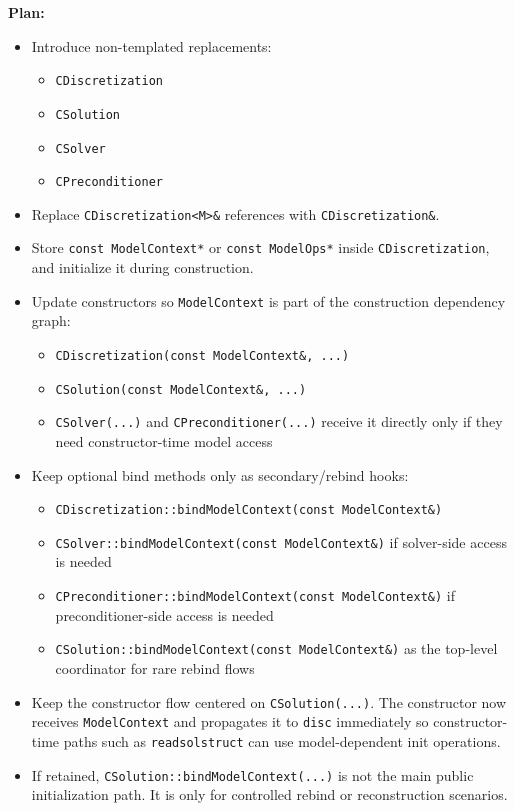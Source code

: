 \documentclass[11pt]{article}
\begin{document}
\textbf{Plan:}
\begin{itemize}[leftmargin=*]
\item Introduce non-templated replacements:
\begin{itemize}[leftmargin=*]
\item \texttt{CDiscretization}
\item \texttt{CSolution}
\item \texttt{CSolver}
\item \texttt{CPreconditioner}
\end{itemize}
\item Replace \texttt{CDiscretization<M>\&} references with \texttt{CDiscretization\&}.
\item Store \texttt{const ModelContext*} or \texttt{const ModelOps*} inside \texttt{CDiscretization}, and initialize it during construction.
\item Update constructors so \texttt{ModelContext} is part of the construction dependency graph:
\begin{itemize}[leftmargin=*]
\item \texttt{CDiscretization(const ModelContext\&, ...)}
\item \texttt{CSolution(const ModelContext\&, ...)}
\item \texttt{CSolver(...)} and \texttt{CPreconditioner(...)} receive it directly only if they need constructor-time model access
\end{itemize}
\item Keep optional bind methods only as secondary/rebind hooks:
\begin{itemize}[leftmargin=*]
\item \texttt{CDiscretization::bindModelContext(const ModelContext\&)}
\item \texttt{CSolver::bindModelContext(const ModelContext\&)} if solver-side access is needed
\item \texttt{CPreconditioner::bindModelContext(const ModelContext\&)} if preconditioner-side access is needed
\item \texttt{CSolution::bindModelContext(const ModelContext\&)} as the top-level coordinator for rare rebind flows
\end{itemize}
\item Keep the constructor flow centered on \texttt{CSolution(...)}. The constructor now receives \texttt{ModelContext} and propagates it to \texttt{disc} immediately so constructor-time paths such as \texttt{readsolstruct} can use model-dependent init operations.
\item If retained, \texttt{CSolution::bindModelContext(...)} is not the main public initialization path. It is only for controlled rebind or reconstruction scenarios.

\end{itemize}
\end{document}
